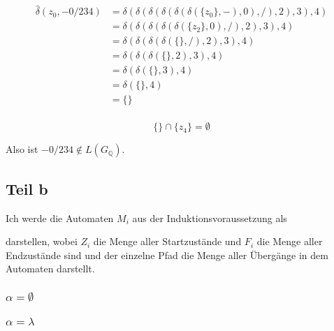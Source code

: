 \documentclass[10pt,a4paper]{article}
\begin{document}
\begin{align*}
  \hat{\delta}(z_{0}, -0/234) & = \delta(\delta(\delta(\delta(\delta(\delta(\{ z_{0} \}, -), 0), /), 2), 3), 4)\\
  & = \delta(\delta(\delta(\delta(\delta(\{ z_{2} \}, 0), /), 2), 3), 4)\\
  & = \delta(\delta(\delta(\delta(\{  \}, /), 2), 3), 4)\\
  & = \delta(\delta(\delta(\{  \}, 2), 3), 4)\\
  & = \delta(\delta(\{  \}, 3), 4)\\
  & = \delta(\{  \}, 4)\\
  & = \{  \}\\
\end{align*}

\begin{equation}
  \{  \} \cap \{ z_{4} \} = \emptyset
\end{equation}

Also ist $-0/234 \not\in L(G_{\mathbb{Q}})$.

\subsection{Teil b}

Ich werde die Automaten $M_{i}$ aus der Induktionsvoraussetzung als
darstellen, wobei $Z_{i}$ die Menge aller Startzustände und $F_{i}$ die Menge aller Endzustände sind und der einzelne Pfad die Menge aller Übergänge in dem Automaten darstellt.

\subsubsection{$\alpha = \emptyset$}


\subsubsection{$\alpha = \lambda$}
\end{document}
